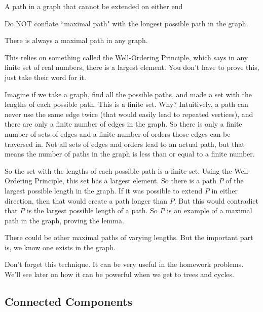 \documentclass[11pt]{scrartcl}
\begin{document}
\begin{definition}
    A path in a graph that cannot be extended on either end
\end{definition}

\begin{caveat}
Do NOT conflate ``maximal path" with the longest possible path in the graph.
\end{caveat}

\begin{lemma}
    There is always a maximal path in any graph.
\end{lemma}
This relies on something called the Well-Ordering Principle, which says in any finite set of real numbers, there is a largest element. You don't have to prove this, just take their word for it.

Imagine if we take a graph, find all the possible paths, and made a set with the lengths of each possible path. This is a finite set. Why? Intuitively, a path can never use the same edge twice (that would easily lead to repeated vertices), and there are only a finite number of edges in the graph. So there is only a finite number of sets of edges and a finite number of orders those edges can be traversed in. Not all sets of edges and orders lead to an actual path, but that means the number of paths in the graph is less than or equal to a finite number.

So the set with the lengths of each possible path is a finite set. Using the Well-Ordering Principle, this set has a largest element. So there is a path $P$ of the largest possible length in the graph. If it was possible to extend $P$ in either direction, then that would create a path longer than $P$. But this would contradict that $P$ is the largest possible length of a path. So $P$ is an example of a maximal path in the graph, proving the lemma.

There could be other maximal paths of varying lengths. But the important part is, we know one exists in the graph.

\begin{advice}
Don't forget this technique. It can be very useful in the homework problems. We'll see later on how it can be powerful when we get to trees and cycles.
\end{advice}


\subsection{Connected Components}
\end{document}
